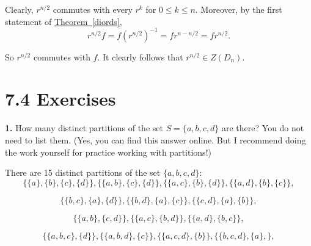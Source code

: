 \documentclass[10pt,]{book}
\theoremstyle{plain}
\theoremstyle{definition}
\theoremstyle{definition}
\theoremstyle{definition}
\theoremstyle{definition}
\numberwithin{equation}{section}
\begin{document}
      Clearly, \(r^{n/2}\) commutes with every \(r^k\) for \(0\leq k\leq n\). Moreover, by the first statement of \hyperref[diords]{Theorem~\ref{diords}},
\begin{equation*}

        r^{n/2}f=f(r^{n/2})^{-1}=fr^{n-n/2}=fr^{n/2}.
      
\end{equation*}

\par

      So \(r^{n/2}\) commutes with \(f\). It clearly follows that \(r^{n/2}\in Z(D_n)\).
\par\smallskip
\section*{7.4 Exercises}
\noindent\textbf{1.}\quad{}
        How many distinct partitions of the set
        \(S=\{a,b,c,d\}\) are there? You do not need to list them.
        (Yes, you can find this answer online. But I recommend
        doing the work yourself for practice working with
        partitions!)
\par\smallskip

      There are 15 distinct partitions of the set \(\{a,b,c,d\}\):
\begin{equation*}

        \{\{a\},\{b\},\{c\},\{d\}\}, \{\{a,b\},\{c\},\{d\}\},\{\{a,c\},\{b\},\{d\}\},\{\{a,d\},\{b\},\{c\}\},
      
\end{equation*}

\begin{equation*}

        \{\{b,c\},\{a\},\{d\}\},\{\{b,d\},\{a\},\{c\}\},\{\{c,d\},\{a\},\{b\}\},
      
\end{equation*}

\begin{equation*}

        \{\{a,b\},\{c,d\}\},
        \{\{a,c\},\{b,d\}\},\{\{a,d\},\{b,c\}\},
      
\end{equation*}

\begin{equation*}

        \{\{a,b,c\},\{d\}\},\{\{a,b,d\},\{c\}\},\{\{a,c,d\},\{b\}\},\{\{b,c,d\},\{a\},\},
      
\end{equation*}
\end{document}
